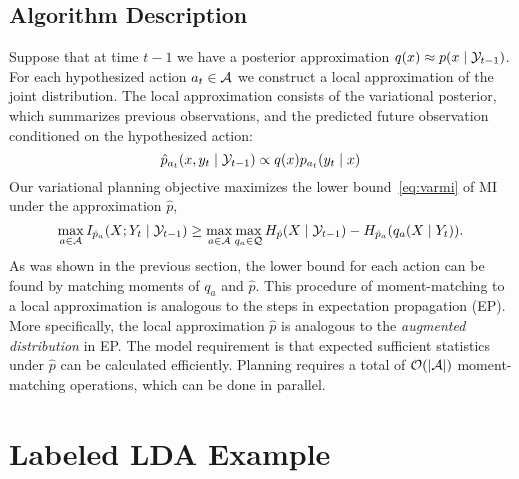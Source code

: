 \documentclass{article}
\begin{document}


\subsection{Algorithm Description}

Suppose that at time $t-1$ we have a posterior approximation $q(x)
\approx p(x \mid \mathcal{Y}_{t-1})$.  For each hypothesized action $a_t \in
\mathcal{A}$ we construct a local approximation of the joint distribution.
The local approximation consists of the variational posterior, which
summarizes previous observations, and the predicted future observation
conditioned on the hypothesized action:
\begin{equation}
  \hat{p}_{a_t}(x,y_t \mid \mathcal{Y}_{t-1}) \propto q(x) p_{a_t}(y_t \mid x)
\end{equation}
Our variational planning
objective maximizes the lower bound~\eqref{eq:varmi} of MI under the
approximation $\hat{p}$,
\begin{equation}
  \max_{a\in\mathcal{A}} I_{\hat{p}_a}(X;Y_t \mid \mathcal{Y}_{t-1} ) \geq
  \max_{a\in\mathcal{A}} \max_{q_a\in\mathcal{Q}} H_{\hat{p}}(X \mid \mathcal{Y}_{t-1}) - H_{\hat{p}_a}(
  q_a(X\mid Y_t) ).
\end{equation}
As was shown in the previous section, the lower bound for each action
can be found by matching moments of $q_a$ and $\hat{p}$.  This
procedure of moment-matching to a local approximation is analogous to
the steps in expectation propagation (EP).  More specifically, the
local approximation $\hat{p}$ is analogous to the \emph{augmented
  distribution} in EP.  The model requirement is that expected
sufficient statistics under $\hat{p}$ can be calculated efficiently.
Planning requires a total of $\mathcal{O}( |\mathcal{A}| )$ moment-matching
operations, which can be done in parallel.



\section{Labeled LDA Example}\label{sec:llda}
\end{document}
